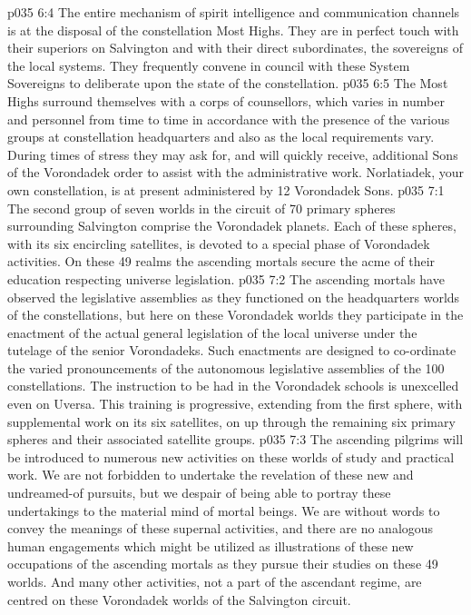 \vs p035 6:4 The entire mechanism of spirit intelligence and communication channels is at the disposal of the constellation Most Highs. They are in perfect touch with their superiors on Salvington and with their direct subordinates, the sovereigns of the local systems. They frequently convene in council with these System Sovereigns to deliberate upon the state of the constellation.
\vs p035 6:5 The Most Highs surround themselves with a corps of counsellors, which varies in number and personnel from time to time in accordance with the presence of the various groups at constellation headquarters and also as the local requirements vary. During times of stress they may ask for, and will quickly receive, additional Sons of the Vorondadek order to assist with the administrative work. Norlatiadek, your own constellation, is at present administered by 12 Vorondadek Sons.
\vs p035 7:1 The second group of seven worlds in the circuit of 70 primary spheres surrounding Salvington comprise the Vorondadek planets. Each of these spheres, with its six encircling satellites, is devoted to a special phase of Vorondadek activities. On these 49 realms the ascending mortals secure the acme of their education respecting universe legislation.
\vs p035 7:2 The ascending mortals have observed the legislative assemblies as they functioned on the headquarters worlds of the constellations, but here on these Vorondadek worlds they participate in the enactment of the actual general legislation of the local universe under the tutelage of the senior Vorondadeks. Such enactments are designed to co\hyp{}ordinate the varied pronouncements of the autonomous legislative assemblies of the 100 constellations. The instruction to be had in the Vorondadek schools is unexcelled even on Uversa. This training is progressive, extending from the first sphere, with supplemental work on its six satellites, on up through the remaining six primary spheres and their associated satellite groups.
\vs p035 7:3 The ascending pilgrims will be introduced to numerous new activities on these worlds of study and practical work. We are not forbidden to undertake the revelation of these new and undreamed\hyp{}of pursuits, but we despair of being able to portray these undertakings to the material mind of mortal beings. We are without words to convey the meanings of these supernal activities, and there are no analogous human engagements which might be utilized as illustrations of these new occupations of the ascending mortals as they pursue their studies on these 49 worlds. And many other activities, not a part of the ascendant regime, are centred on these Vorondadek worlds of the Salvington circuit.
